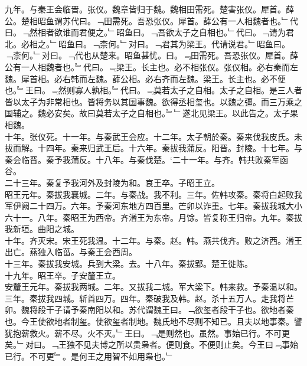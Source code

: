 \documentclass{zhvt-classic}
\begin{document}
\hspace*{2em}九年。与秦王会临晋。张仪。魏章皆归于魏。魏相田需死。楚害张仪。犀首。薛公。楚相昭鱼谓苏代曰。﹁田需死。吾恐张仪。犀首。薛公有一人相魏者也。﹂代曰。﹁然相者欲谁而君便之。﹂昭鱼曰。﹁吾欲太子之自相也。﹂代曰。﹁请为君北。必相之。﹂昭鱼曰。﹁柰何。﹂对曰。﹁君其为梁王。代请说君。﹂昭鱼曰。﹁柰何。﹂对曰。﹁代也从楚来。昭鱼甚忧。曰。﹃田需死。吾恐张仪。犀首。薛公有一人相魏者也。﹄代曰。﹃梁王。长主也。必不相张仪。张仪相。必右秦而左魏。犀首相。必右韩而左魏。薛公相。必右齐而左魏。梁王。长主也。必不便也。﹄王曰。﹃然则寡人孰相。﹄代曰。﹃莫若太子之自相。太子之自相。是三人者皆以太子为非常相也。皆将务以其国事魏。欲得丞相玺也。以魏之彊。而三万乘之国辅之。魏必安矣。故曰莫若太子之自相也。﹄﹂遂北见梁王。以此告之。太子果相魏。\\
\hspace*{2em}十年。张仪死。十一年。与秦武王会应。十二年。太子朝於秦。秦来伐我皮氏。未拔而解。十四年。秦来归武王后。十六年。秦拔我蒲反。阳晋。封陵。十七年。与秦会临晋。秦予我蒲反。十八年。与秦伐楚。`二十一年。与齐。韩共败秦军函谷。\\
\hspace*{2em}二十三年。秦复予我河外及封陵为和。哀王卒。子昭王立。\\
\hspace*{2em}昭王元年。秦拔我襄城。二年。与秦战。我不利。三年。佐韩攻秦。秦将白起败我军伊阙二十四万。六年。予秦河东地方四百里。芒卯以诈重。七年。秦拔我城大小六十一。八年。秦昭王为西帝。齐湣王为东帝。月馀。皆复称王归帝。九年。秦拔我新垣。曲阳之城。\\
\hspace*{2em}十年。齐灭宋。宋王死我温。十二年。与秦。赵。韩。燕共伐齐。败之济西。湣王出亡。燕独入临菑。与秦王会西周。\\
\hspace*{2em}十三年。秦拔我安城。兵到大梁。去。十八年。秦拔郢。楚王徙陈。\\
\hspace*{2em}十九年。昭王卒。子安釐王立。\\
\hspace*{2em}安釐王元年。秦拔我两城。二年。又拔我二城。军大梁下。韩来救。予秦温以和。三年。秦拔我四城。斩首四万。四年。秦破我及韩。赵。杀十五万人。走我将芒卯。魏将段干子请予秦南阳以和。苏代谓魏王曰。﹁欲玺者段干子也。欲地者秦也。今王使欲地者制玺。使欲玺者制地。魏氏地不尽则不知已。且夫以地事秦。譬犹抱薪救火。薪不尽。火不灭。﹂王曰。﹁是则然也。虽然。事始已行。不可更矣。﹂对曰。﹁王独不见夫博之所以贵枭者。便则食。不便则止矣。今王曰﹃事始已行。不可更﹄。是何王之用智不如用枭也。﹂\\
\end{document}

